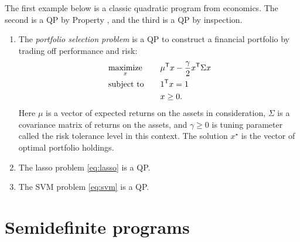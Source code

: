 \begin{Example}
The first example below is a classic quadratic program from economics. The
second is a QP by Property , and the third is a QP by
inspection.     

\begin{enumerate}[label=\alph*.]
\item The \emph{portfolio selection problem} is a QP to construct a financial
  portfolio by trading off performance and risk:  
  \begin{alignat*}{2}
  &\operatorname*{maximize}_x \quad && \mu^{\mathsf{T}} x - \frac{\gamma}{2} x^{\mathsf{T}} \Sigma x \\ 
  &\operatorname{subject\,\,to} \quad && 1^{\mathsf{T}} x = 1 \\
  & && x \geq 0.
  \end{alignat*}
  Here $\mu$ is a vector of expected returns on the assets in consideration,
  $\Sigma$ is a covariance matrix of returns on the assets, and $\gamma \geq 0$
  is tuning parameter called the risk tolerance level in this context. The
  solution $x^\star$ is the vector of optimal portfolio holdings.  

\item The lasso problem \eqref{eq:lasso} is a QP. 

\item The SVM problem \eqref{eq:svm} is a QP.
\end{enumerate}
\end{Example}

\section{Semidefinite programs}
\label{sec:semidefinite_programs}

